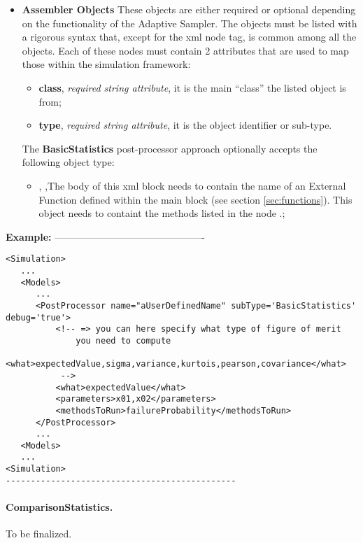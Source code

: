 \begin{itemize}
  \item \textbf{Assembler Objects} These objects are either required or optional
  depending on the functionality of the Adaptive Sampler.
  The objects must be listed with a rigorous syntax that, except for the xml
  node tag, is common among all the objects.
  Each of these nodes must contain 2 attributes that are used to map those
  within the simulation framework:
   \begin{itemize}
    \item \textbf{class}, \textit{required string attribute}, it is the main
    ``class'' the listed object is from;
    \item \textbf{type}, \textit{required string attribute}, it is the object
    identifier or sub-type.
    \end{itemize}
  The \textbf{BasicStatistics} post-processor approach optionally accepts the
  following object type:
   \begin{itemize}
    \item {}, ,The body of
    this xml block needs to contain the name of an External Function defined
    within the  main block (see section \ref{sec:functions}).
    This object needs to containt the methods listed in the node
    .;
    \end{itemize}
\end{itemize}
\textbf{Example:}
----------------------------------------------
\begin{lstlisting}[style=XML]
<Simulation>
   ...
   <Models>
      ...
      <PostProcessor name="aUserDefinedName" subType='BasicStatistics'  debug='true'>
          <!-- => you can here specify what type of figure of merit
              you need to compute
             <what>expectedValue,sigma,variance,kurtois,pearson,covariance</what>
           -->
          <what>expectedValue</what>
          <parameters>x01,x02</parameters>
          <methodsToRun>failureProbability</methodsToRun>
      </PostProcessor>
      ...
   <Models>
   ...
<Simulation>
----------------------------------------------
\end{lstlisting}

\paragraph{ComparisonStatistics.}
\label{ComparisonStatistics}
To be finalized.

